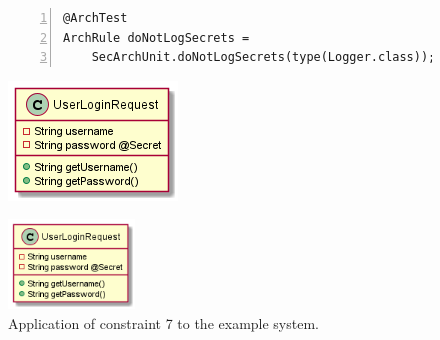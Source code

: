 \begin{figure}
\centering
\begin{minipage}{.6\textwidth}
  \centering
    \begin{lstlisting}[label=lst:constraint_7_rule, numbers=left]
@ArchTest
ArchRule doNotLogSecrets =
    SecArchUnit.doNotLogSecrets(type(Logger.class));
    \end{lstlisting}
  \label{fig:test1}
\end{minipage}%
\begin{minipage}{.4\textwidth}
  \centering
  \includegraphics[width=.4\linewidth]{figure/toyexamples/Secrets.png}
  \label{fig:test2}
\end{minipage}
\end{figure}



\begin{figure}
    \centering
    \includegraphics[width=0.3\textwidth]{figure/toyexamples/Secrets.png}
    \caption{Application of constraint 7 to the example system.}
    \label{fig:assets_toy_system}
\end{figure}